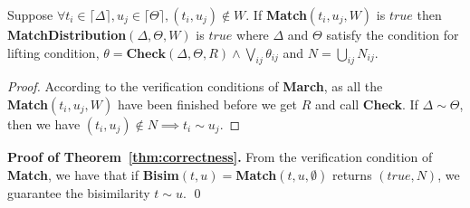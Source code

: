 \documentclass[a4paper,UKenglish,cleveref, autoref]{lipics-v2019}
\begin{document}
\begin{proposition}
	Suppose $\forall t_i\in\lceil\Delta\rceil,u_j\in\lceil\Theta\rceil , (t_i,u_j)\notin W$.
	If \textbf{Match}$(t_i,u_j,W)$ is $true$ then \textbf{MatchDistribution}$(\Delta,\Theta,W)$ is $true$ where $\Delta$ and $\Theta$ satisfy the condition for lifting condition, $\theta=\textbf{Check}(\Delta,\Theta,\textit{R})\wedge\bigvee_{ij}\theta_{ij}$  and $N=\bigcup_{ij}N_{ij}$.
\end{proposition}
\begin{proof}
	According to the verification conditions of \textbf{March}, as all the \\\textbf{Match}$(t_i,u_j,W)$ have been finished before we get $R$ and call \textbf{Check}. If $\Delta\sim \Theta$, then we have $(t_i,u_j)\notin N\implies t_i\sim u_j$.
\end{proof}

\noindent\textbf{Proof of Theorem~\ref{thm:correctness}.} 
From the verification condition of \textbf{Match}, we have that if \textbf{Bisim}$(t,u)=$\textbf{Match}$(t,u,\emptyset)$ returns $(true, N)$, we guarantee the bisimilarity $t\sim u$.
\hfill\qed
\end{document}
